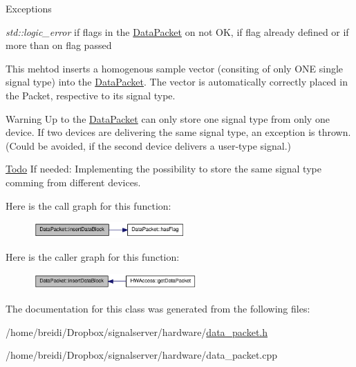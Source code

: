 \begin{DoxyExceptions}{Exceptions}
\item[{\em std::logic\_\-error}]if flags in the \hyperlink{class_data_packet}{DataPacket} on not OK, if flag already defined or if more than on flag passed\end{DoxyExceptions}
This mehtod inserts a homogenous sample vector (consiting of only ONE single signal type) into the \hyperlink{class_data_packet}{DataPacket}. The vector is automatically correctly placed in the Packet, respective to its signal type. \begin{DoxyWarning}{Warning}
Up to the \hyperlink{class_data_packet}{DataPacket} can only store one signal type from only one device. If two devices are delivering the same signal type, an exception is thrown. (Could be avoided, if the second device delivers a user-\/type signal.) 
\end{DoxyWarning}
\begin{Desc}
\item[\hyperlink{todo__todo000005}{Todo}]If needed: Implementing the possibility to store the same signal type comming from different devices. \end{Desc}


Here is the call graph for this function:\nopagebreak
\begin{figure}[H]
\begin{center}
\leavevmode
\includegraphics[width=165pt]{class_data_packet_ab83c192471bb4d70cd21653adcc7da7f_cgraph}
\end{center}
\end{figure}


Here is the caller graph for this function:\nopagebreak
\begin{figure}[H]
\begin{center}
\leavevmode
\includegraphics[width=178pt]{class_data_packet_ab83c192471bb4d70cd21653adcc7da7f_icgraph}
\end{center}
\end{figure}


The documentation for this class was generated from the following files:\begin{DoxyCompactItemize}
\item 
/home/breidi/Dropbox/signalserver/hardware/\hyperlink{data__packet_8h}{data\_\-packet.h}\item 
/home/breidi/Dropbox/signalserver/hardware/data\_\-packet.cpp\end{DoxyCompactItemize}
